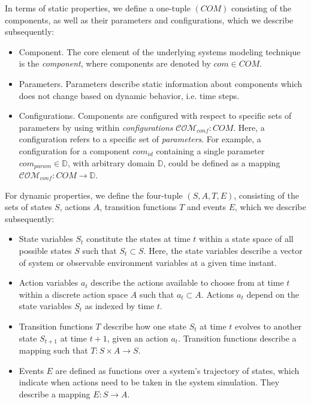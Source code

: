 \documentclass[a4paper,twoside]{article}
\begin{document}
	In terms of static properties, we define a one-tuple $(COM)$ consisting of the components, as well as their parameters and configurations, which we describe subsequently:
	\begin{itemize}
		\item Component. The core element of the underlying systems modeling technique is the \textit{component}, where components are denoted by $com \in COM$. 
		\item Parameters. Parameters describe static information about components which does not change based on dynamic behavior, i.e. time steps.
		\item Configurations. Components are configured with respect to specific sets of parameters by using within \textit{configurations} $\mathcal{COM}_{conf}: COM$. Here, a configuration refers to a specific set of \textit{parameters}. For example, a configuration for a component $com_{id}$ containing a single parameter $com_{param} \in \mathbb{D}$, with arbitrary domain $\mathbb{D}$, could be defined as a mapping $\mathcal{COM}_{conf}: COM \rightarrow \mathbb{D}$.
		
		
	\end{itemize}
	
	
	For dynamic properties, we define the four-tuple $(S, A, T, E)$, consisting of the sets of states $S$, actions $A$, transition functions $T$ and events $E$, which we describe subsequently:	
	\begin{itemize}
		\item State variables $S_t$ constitute the states at time $t$ within a state space of all possible states $S$ such that $S_t \subset S$. Here, the state variables describe a vector of system or observable environment variables at a given time instant. 
		\item Action variables $a_t$ describe the actions available to choose from at time $t$ within a discrete action space $A$ such that $a_t \subset A$. Actions $a_t$ depend on the state variables $S_t$ as indexed by time $t$.
		\item Transition functions $T$ describe how one state $S_t$ at time $t$ evolves to another state $S_{t+1}$ at time $t+1$, given an action $a_t$. Transition functions describe a mapping such that $T : S \times A \to S$. 
		\item Events $E$ are defined as functions over a system's trajectory of states, which indicate when actions need to be taken in the system simulation. They describe a mapping $E : S \to A$. 
	\end{itemize}
	
\end{document}
